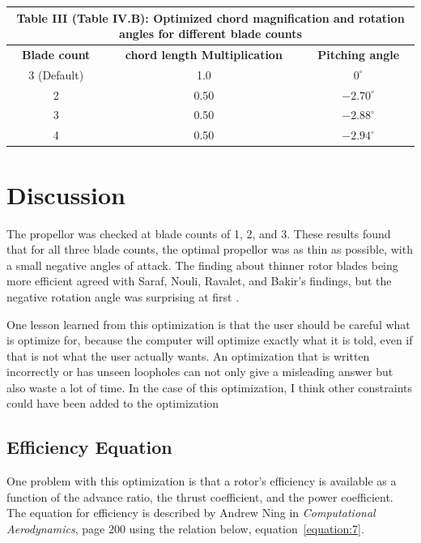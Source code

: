 \documentclass[journal ]{new-aiaa}
\begin{document}
\begin{center}
\begin{tabular}{| c | c | c |}
	 \multicolumn{3}{c}{Table III (Table IV.B): Optimized chord magnification and rotation angles for different blade counts}  \\ \hline
  	 \textbf{Blade count} & \textbf{chord length Multiplication} & \textbf{Pitching angle} \\ \hline
  	 3 (Default) & 1.0 & $0^{\circ}$ \\ \hline
  	 2 & 0.50 & $-2.70^{\circ}$ \\ \hline
  	 3 & 0.50 & $-2.88^{\circ}$ \\ \hline
  	 4 & 0.50 & $-2.94^{\circ}$ \\ \hline
\end{tabular}
\label{tab:6}
\end{center}


\section{Discussion}

The propellor was checked at blade counts of 1, 2, and 3. These results found that for all three blade counts, the optimal propellor was as thin as possible, with a small negative angles of attack. The finding about thinner rotor blades being more efficient agreed with Saraf, Nouli, Ravalet, and Bakir's findings, but the negative rotation angle was surprising at first \cite{AxFlFan}.

One lesson learned from this optimization is that the user should be careful what is optimize for, because the computer will optimize exactly what it is told, even if that is not what the user actually wants. An optimization that is written incorrectly or has unseen loopholes can not only give a misleading answer but also waste a lot of time. In the case of this optimization, I think other constraints could have been added to the optimization

\subsection{Efficiency Equation}

One problem with this optimization is that a rotor's efficiency is available as a function of the advance ratio, the thrust coefficient, and the power coefficient. The equation for efficiency is described by Andrew Ning in \emph{Computational Aerodynamics}, page 200 \cite{ComAer} using the relation below, equation~\eqref{equation:7}.
\end{document}
